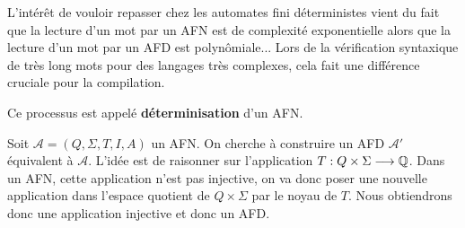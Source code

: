 L'intérêt de vouloir repasser chez les automates fini déterministes vient du fait que la lecture d'un mot par 
un AFN est de complexité exponentielle alors que la lecture d'un mot par un AFD est polynômiale... 
Lors de la vérification syntaxique de très long mots pour des langages très complexes, cela fait une différence 
cruciale pour la compilation. 

Ce processus est appelé \textbf{déterminisation} d'un AFN. 

\begin{proposition}
    Soit $ \mathcal{A} = (Q, \Sigma, T, I, A)$ un AFN. On cherche à construire un AFD $ \mathcal{A}'$ équivalent à $ \mathcal{A}$. 
    L'idée est de raisonner sur l'application $T : Q \times \Sigma \longrightarrow \mathbb{Q}$. Dans un AFN, cette application 
    n'est pas injective, on va donc poser une nouvelle application dans l'espace quotient de $Q \times \Sigma$ par le noyau de $T$. 
    Nous obtiendrons donc une application injective et donc un AFD. 
\end{proposition}


